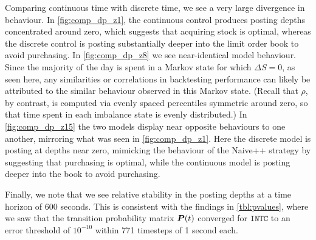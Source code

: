 Comparing continuous time with discrete time, we see a very large divergence in behaviour. In \autoref{fig:comp_dp_z1}, the continuous control produces posting depths concentrated around zero, which suggests that acquiring stock is optimal, whereas the discrete control is posting substantially deeper into the limit order book to avoid purchasing. In \autoref{fig:comp_dp_z8} we see near-identical model behaviour. Since the majority of the day is spent in a Markov state for which $\Delta S = 0$, as seen here, any similarities or correlations in backtesting performance can likely be attributed to the similar behaviour observed in this Markov state. (Recall that $\rho$, by contrast, is computed via evenly spaced percentiles symmetric around zero, so that time spent in each imbalance state is evenly distributed.) In \autoref{fig:comp_dp_z15} the two models display near opposite behaviours to one another, mirroring what was seen in \autoref{fig:comp_dp_z1}. Here the discrete model is posting at depths near zero, mimicking the behaviour of the Naive++ strategy by suggesting that purchasing is optimal, while the continuous model is posting deeper into the book to avoid purchasing.

Finally, we note that we see relative stability in the posting depths at a time horizon of 600 seconds. This is consistent with the findings in \autoref{tbl:pvalues}, where we saw that the transition probability matrix $\boldsymbol{P}(t)$ converged for $\texttt{INTC}$ to an error threshold of $10^{-10}$ within 771 timesteps of 1 second each.

